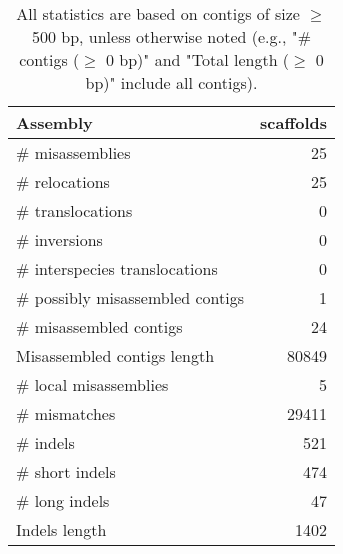 \documentclass[12pt,a4paper]{article}
\begin{document}
\begin{table}[ht]
\begin{center}
\caption{All statistics are based on contigs of size $\geq$ 500 bp, unless otherwise noted (e.g., "\# contigs ($\geq$ 0 bp)" and "Total length ($\geq$ 0 bp)" include all contigs).}
\begin{tabular}{|l*{1}{|r}|}
\hline
Assembly & scaffolds \\ \hline
\# misassemblies & 25 \\ \hline
\hspace{5mm}\# relocations & 25 \\ \hline
\hspace{5mm}\# translocations & 0 \\ \hline
\hspace{5mm}\# inversions & 0 \\ \hline
\hspace{5mm}\# interspecies translocations & 0 \\ \hline
\# possibly misassembled contigs & 1 \\ \hline
\# misassembled contigs & 24 \\ \hline
Misassembled contigs length & 80849 \\ \hline
\# local misassemblies & 5 \\ \hline
\# mismatches & 29411 \\ \hline
\# indels & 521 \\ \hline
\hspace{5mm}\# short indels & 474 \\ \hline
\hspace{5mm}\# long indels & 47 \\ \hline
Indels length & 1402 \\ \hline
\end{tabular}
\end{center}
\end{table}
\end{document}
